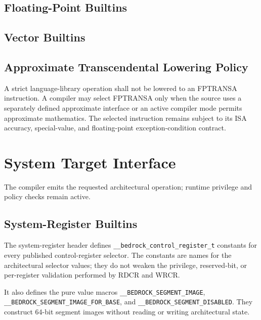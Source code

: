 \documentclass[10pt,twoside]{article}
\begin{document}
\subsection{Floating-Point Builtins}

\subsection{Vector Builtins}

\subsection{Approximate Transcendental Lowering Policy}
A strict language-library operation shall not be lowered to an FPTRANSA
instruction. A compiler may select FPTRANSA only when the source uses a
separately defined approximate interface or an active compiler mode permits
approximate mathematics. The selected instruction remains subject to its ISA
accuracy, special-value, and floating-point exception-condition contract.

\section{System Target Interface}\label{page:system-target-interface}
The compiler emits the requested architectural operation; runtime privilege and policy checks
remain active.

\subsection{System-Register Builtins}

The system-register header defines \texttt{\_\_bedrock\_control\_register\_t} constants for every published
control-register selector. The constants are names for the architectural selector values; they do not weaken the
privilege, reserved-bit, or per-register validation performed by RDCR and WRCR.

It also defines the pure value macros
\texttt{\_\allowbreak{}\_\allowbreak{}BEDROCK\_\allowbreak{}SEGMENT\_\allowbreak{}IMAGE},
\texttt{\_\allowbreak{}\_\allowbreak{}BEDROCK\_\allowbreak{}SEGMENT\_\allowbreak{}IMAGE\_\allowbreak{}FOR\_\allowbreak{}BASE}, and
\texttt{\_\allowbreak{}\_\allowbreak{}BEDROCK\_\allowbreak{}SEGMENT\_\allowbreak{}DISABLED}. They construct 64-bit segment
images without reading or writing architectural state.
\end{document}
